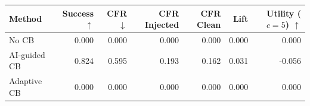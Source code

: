 \begin{tabular}{lrrrrrr}
\toprule
Method & Success $\uparrow$ & CFR $\downarrow$ & CFR Injected & CFR Clean & Lift & Utility ($c=5$) $\uparrow$ \\
\midrule
No CB & 0.000 & 0.000 & 0.000 & 0.000 & 0.000 & 0.000 \\
AI-guided CB & 0.824 & 0.595 & 0.193 & 0.162 & 0.031 & -0.056 \\
Adaptive CB & 0.000 & 0.000 & 0.000 & 0.000 & 0.000 & 0.000 \\
\bottomrule
\end{tabular}
